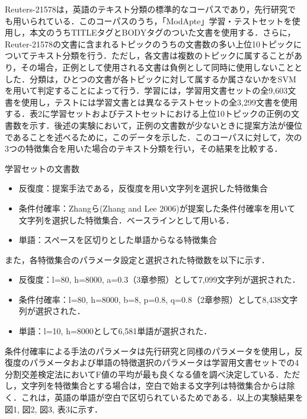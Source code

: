 \documentclass[japanese]{jnlp_1.4}
\begin{document}
Reuters-21578は，英語のテキスト分類の標準的なコーパスであり，先行研究でも用いられている．このコーパスのうち，「ModApte」学習・テストセットを使用し，本文のうちTITLEタグとBODYタグのついた文書を使用する．さらに，Reuter-21578の文書に含まれるトピックのうちの文書数の多い上位10トピックについてテキスト分類を行う．ただし，各文書は複数のトピックに属することがあり，その場合，正例として使用される文書は負例として同時に使用しないこととした．分類は，ひとつの文書が各トピックに対して属するか属さないかをSVMを用いて判定することによって行う．学習には，学習用文書セットの全9,603文書を使用し，テストには学習文書とは異なるテストセットの全3,299文書を使用する．表2に学習セットおよびテストセットにおける上位10トピックの正例の文書数を示す．後述の実験において，正例の文書数が少ないときに提案方法が優位であることを述べるために，このデータを示した．このコーパスに対して，次の3つの特徴集合を用いた場合のテキスト分類を行い，その結果を比較する．


\begin{table}[b]
\caption{学習セットの文書数}

\end{table}

\begin{itemize}
\item 反復度：提案手法である，反復度を用い文字列を選択した特徴集合
\item 条件付確率：Zhangら(Zhang and Lee 2006)が提案した条件付確率を用いて文字列を選択した特徴集合．ベースラインとして用いる．
\item 単語：スペースを区切りとした単語からなる特徴集合
\end{itemize}

また，各特徴集合のパラメータ設定と選択された特徴数を以下に示す．

\begin{itemize}
\item 反復度：l=80, h=8000, a=0.3（3章参照）として7,099文字列が選択された．
\item 条件付確率：l=80, h=8000, b=8, p=0.8, q=0.8（2章参照）として8,438文字列が選択された．
\item 単語：l=10, h=8000として6,581単語が選択された．
\end{itemize}

条件付確率による手法のパラメータは先行研究と同様のパラメータを使用し，反復度のパラメータおよび単語の特徴選択のパラメータは学習用文書セットでの4分割交差検定法においてF値の平均が最も良くなる値を調べ決定している．ただし，文字列を特徴集合とする場合は，空白で始まる文字列は特徴集合からは除く．これは，英語の単語が空白で区切られているためである．以上の実験結果を図1, 図2, 図3, 表3に示す．
\end{document}
